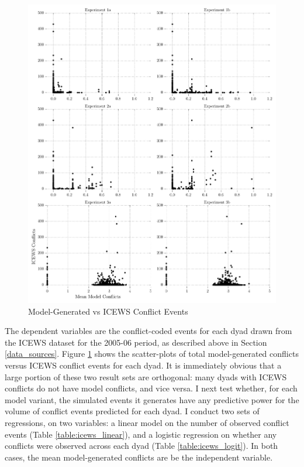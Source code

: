 \begin{figure}[t!]
    \centering
    \includegraphics[width=\textwidth]{BDM_Reproduction/Figures/ICEWS_Scatters}
    \caption{Model-Generated vs ICEWS Conflict Events}
    \label{fig:icews_scatters}
    \figSpace
\end{figure}

The dependent variables are the conflict-coded events for each dyad drawn from the ICEWS dataset for the 2005-06 period, as described above in Section \ref{data_sources}. Figure \ref{fig:icews_scatters} shows the scatter-plots of total model-generated conflicts versus ICEWS conflict events for each dyad. It is immediately obvious that a large portion of these two result sets are orthogonal: many dyads with ICEWS conflicts do not have model conflicts, and vice versa.  I next test whether, for each model variant, the simulated events it generates have any predictive power for the volume of conflict events predicted for each dyad. I conduct two sets of regressions, on two variables: a linear model on the number of observed conflict events (Table \ref{table:icews_linear}), and a logistic regression on whether any conflicts were observed across each dyad (Table \ref{table:icews_logit}). In both cases, the mean model-generated conflicts are be the independent variable. 

